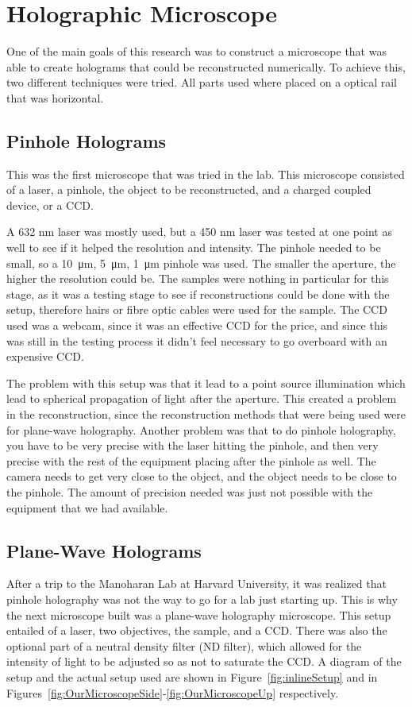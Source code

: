 %
%

\chapter{Holographic Microscope} \label{chap:Micro}

One of the main goals of this research was to construct a microscope that was
able to create holograms that could be reconstructed numerically. To achieve
this, two different techniques were tried. All parts used where placed on a
optical rail that was horizontal.

\section{Pinhole Holograms}
This was the first microscope that was tried in the lab. This microscope
consisted of a laser, a pinhole, the object to be reconstructed, and a charged
coupled device, or a CCD.

A 632 nm laser was mostly used, but a 450 nm laser was tested at one point as
well to see if it helped the resolution and intensity. The pinhole needed to be
small, so a \SI{10}{\micro\meter}, \SI{5}{\micro\meter}, \SI{1}{\micro\meter} pinhole was used. The smaller the
aperture, the higher the resolution could be. The samples were nothing in
particular for this stage, as it was a testing stage to see if reconstructions
could be done with the setup, therefore hairs or fibre optic cables were used
for the sample. The CCD used was a webcam, since it was an effective CCD for
the price, and since this was still in the testing process it didn't feel
necessary to go overboard with an expensive CCD.

The problem with this setup was that it lead to a point source illumination
which lead to spherical propagation of light after the aperture. This created
a problem in the reconstruction, since the reconstruction methods that were
being used were for plane-wave holography. Another problem was that to do
pinhole holography, you have to be very precise with the laser hitting the
pinhole, and then very precise with the rest of the equipment placing after the
pinhole as well. The camera needs to get very close to the object, and the
object needs to be close to the pinhole. The amount of precision needed was
just not possible with the equipment that we had available.


\section{Plane-Wave Holograms}
After a trip to the Manoharan Lab at Harvard University, it was realized that
pinhole holography was not the way to go for a lab just starting up. This is
why the next microscope built was a plane-wave holography microscope. This
setup entailed of a laser, two objectives, the sample, and a CCD\@. There was
also the optional part of a neutral density filter (ND filter), which allowed for the
intensity of light to be adjusted so as not to saturate the CCD\@. A diagram of
the setup and the actual setup used are shown in Figure~\ref{fig:inlineSetup}
and in Figures~\ref{fig:OurMicroscopeSide}-\ref{fig:OurMicroscopeUp} respectively.

